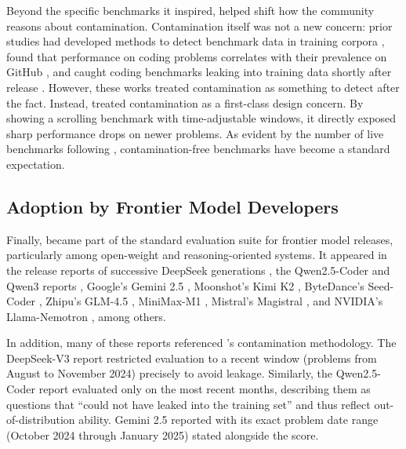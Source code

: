 Beyond the specific benchmarks it inspired, \livecodebench{} helped shift how
the community reasons about contamination. Contamination itself was not a new
concern: prior studies had developed methods to detect benchmark data in
training corpora \citep{golchin2023time}, found that performance on coding
problems correlates with their prevalence on GitHub \citep{roberts2024to,
riddell2024quantifying}, and caught coding benchmarks leaking into training
data shortly after release \citep{matton2024leakage}. However, these works
treated contamination as something to detect after the fact. Instead,
\livecodebench{} treated contamination as a first-class design concern.
By showing a scrolling benchmark with time-adjustable windows, it directly
exposed sharp performance drops on newer problems. As evident by the
number of live benchmarks following \livecodebench{}, contamination-free benchmarks
have become a standard expectation.

\subsection{Adoption by Frontier Model Developers}
Finally, \livecodebench{} became part of the standard evaluation suite for
frontier model releases, particularly among open-weight and
reasoning-oriented systems. It appeared in the release reports of successive
DeepSeek generations \citep{deepseekai2024deepseekv3,
deepseekai2025deepseekr1}, the Qwen2.5-Coder and Qwen3 reports
\citep{qwen2024qwen25coder, qwen2025qwen3technical}, Google's Gemini 2.5
\citep{comanici2025gemini}, Moonshot's Kimi K2 \citep{moonshotai2025kimik2},
ByteDance's Seed-Coder \citep{bytedance2025seedcoder}, Zhipu's GLM-4.5
\citep{zeng2025glm45}, MiniMax-M1 \citep{minimax2025m1}, Mistral's Magistral
\citep{mistral2025magistral}, and NVIDIA's Llama-Nemotron
\citep{bercovich2025llamanemotron}, among others.

In addition, many of these reports referenced \livecodebench{}'s contamination methodology.
The DeepSeek-V3 report \citep{deepseekai2024deepseekv3} restricted evaluation to a
recent window (problems from August to November 2024) precisely to avoid
leakage. Similarly, the Qwen2.5-Coder report \citep{qwen2024qwen25coder}
evaluated only on the most recent months, describing them as questions that ``could
not have leaked into the training set'' and thus reflect
out-of-distribution ability. Gemini 2.5 \citep{comanici2025gemini} reported
\livecodebench{} with its exact problem date range (October 2024 through
January 2025) stated alongside the score.
